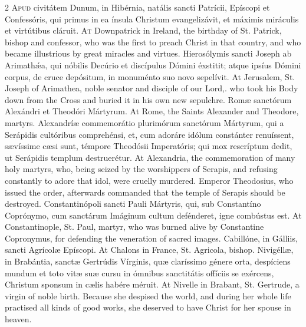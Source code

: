 \begin{paracol}{2}
\lettrine[lines=2]{A}{pud} civitátem Dunum, in Hibérnia, natális sancti Patrícii, Epíscopi et 
 Confessóris, qui primus in ea ínsula Christum evangelizávit, et máximis 
 miráculis et virtútibus cláruit.
\switchcolumn
{}
\lettrine[lines=2]{A}{t} Downpatrick in Ireland, the birthday of St. Patrick, bishop and 
 confessor, who was the first to preach Christ in that country, and who 
 became illustrious by great miracles and virtues.
\switchcolumn*
{}
Hierosólymis sancti Joseph ab Arimathǽa, qui 
 nóbilis Decúrio et discípulus Dómini éxstitit; atque ipsíus Dómini corpus, 
 de cruce depósitum, in monuménto suo novo sepelívit.
\switchcolumn
{}
At Jerusalem, St. Joseph of Arimathea, noble senator and disciple of our 
 Lord,. who took his Body down from the Cross and buried it in his own new 
 sepulchre.
\switchcolumn*
{}
Romæ sanctórum Alexándri et Theodóri Mártyrum.
\switchcolumn
{}
At Rome, the Saints Alexander and Theodore, martyrs.
\switchcolumn*
{}
Alexandríæ commemorátio plurimórum sanctórum 
 Mártyrum, qui a Serápidis cultóribus comprehénsi, et, cum adoráre idólum 
 constánter renuíssent, sævíssime cæsi sunt, témpore Theodósii Imperatóris; 
 qui mox rescríptum dedit, ut Serápidis templum destruerétur.
\switchcolumn
{}
At Alexandria, the commemoration of many holy martyrs, who, being seized by 
 the worshippers of Serapis, and refusing constantly to adore that idol, were 
 cruelly murdered. Emperor Theodosius, who issued the order, afterwards 
 commanded that the temple of Serapis should be destroyed.
\switchcolumn*
{}
Constantinópoli sancti Pauli Mártyris, qui, sub Constantíno Coprónymo, 
 cum sanctárum Imáginum cultum defénderet, igne combústus est.
\switchcolumn
{}
At Constantinople, St. Paul, martyr, who was burned alive by Constantine 
 Copronymus, for defending the veneration of sacred images.
\switchcolumn*
{}
Cabillóne, in Gálliis, sancti Agrícolæ Epíscopi.
\switchcolumn
{}
At Chalons in France, St. Agricola, bishop.
\switchcolumn*
{}
Nivigéllæ, in Brabántia, sanctæ Gertrúdis 
 Vírginis, quæ claríssimo génere orta, despíciens mundum et toto vitæ suæ 
 cursu in ómnibus sanctitátis offíciis se exércens, Christum sponsum in cælis 
 habére méruit.
\switchcolumn
{}
At Nivelle in Brabant, St. Gertrude, a virgin of noble birth. Because 
 she despised the world, and during her whole life practised all kinds of 
 good works, she deserved to have Christ for her spouse in heaven.
\switchcolumn*
{}
\end{paracol}



